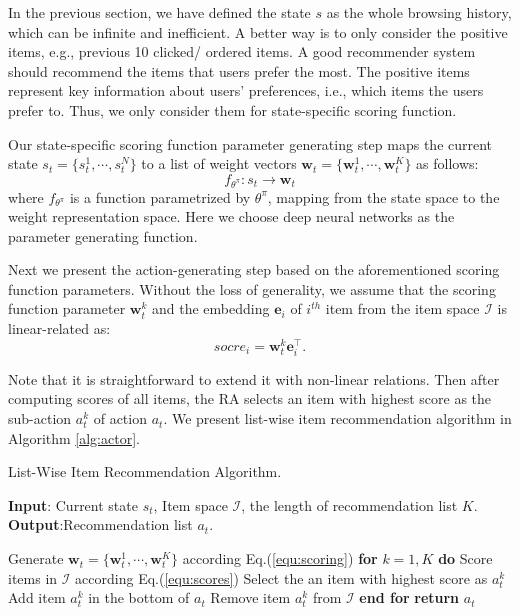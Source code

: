 In the previous section, we have defined the state $s$ as the whole browsing history, which can be infinite and inefficient. A better way is to only consider the positive items, e.g., previous 10 clicked/ ordered items. A good recommender system should recommend the items that users prefer the most. The positive items represent key information about users' preferences, i.e., which items the users prefer to. Thus, we only consider them for state-specific scoring function. 

Our state-specific scoring function parameter generating step maps the current state $s_t = \{s_t^{1}, \cdots, s_t^{N}\}$ to a list of weight vectors $\mathbf{w}_t = \{\mathbf{w}_t^{1}, \cdots, \mathbf{w}_t^{K}\}$ as  follows:
\begin{equation}\label{equ:scoring}
f_{\theta^\pi}:  s_t \rightarrow \mathbf{w}_t
\end{equation}
where $f_{\theta^\pi}$ is a function parametrized by $\theta^\pi$, mapping from the state space to the weight representation space. Here we choose deep neural networks as the parameter generating function. 

Next we present the action-generating step based on the aforementioned scoring function parameters. Without the loss of generality, we assume that the scoring function parameter $\mathbf{w}_t^k$ and the embedding $\mathbf{e}_i$ of $i^{th}$ item from the item space $\mathcal{I}$ is linear-related as: 
\begin{equation}\label{equ:scores}
socre_i = \mathbf{w}_t^k \mathbf{e}_i^\top.
\end{equation}

Note that it is straightforward to extend it with non-linear relations. Then after computing scores of all items, the RA selects an item with highest score as the sub-action $a_t^k$ of action $a_t$.  We present list-wise item recommendation algorithm in Algorithm \ref{alg:actor}.  

\begin{algorithm}
	\caption{\label{alg:actor} List-Wise Item Recommendation Algorithm.}
	\raggedright
	{\bf Input}: Current state $s_t$, Item space $\mathcal{I}$, the length of recommendation list $K$.\\
	{\bf Output}:Recommendation list  $a_t$.\\
	\begin{algorithmic} [1]
		\STATE Generate $\mathbf{w}_t = \{\mathbf{w}_t^{1}, \cdots, \mathbf{w}_t^{K}\}$ according Eq.(\ref{equ:scoring})
		\STATE \textbf{for} $k =1, K$ \textbf{do}
		\STATE \quad Score items in $\mathcal{I}$ according Eq.(\ref{equ:scores})
		\STATE \quad Select the an item with highest score as $a_t^k$
		\STATE \quad Add item $a_t^k$ in the bottom of $a_t$
		\STATE \quad Remove item $a_t^k$ from $\mathcal{I}$
		\STATE \textbf{end for}
		\STATE \textbf{return} $a_t$
	\end{algorithmic}
\end{algorithm}

